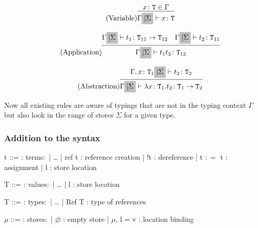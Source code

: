 \begin{equation*}
    \tag{Variable}
    \infer{
        \Gamma \colorbox{lightgray}{$| \Sigma$} \vdash x \colon \texttt{T}
    }{
        x \colon \texttt{T} \in \Gamma
    }
\end{equation*}

\begin{equation*}
    \tag{Application}
    \infer{
        \Gamma \colorbox{lightgray}{$| \Sigma$} \vdash t_1 t_2 \colon \texttt{T}_{12}
    }{
        \Gamma \colorbox{lightgray}{$| \Sigma$} \vdash t_1 \colon \texttt{T}_{11} \rightarrow \texttt{T}_{12}
        &
        \Gamma \colorbox{lightgray}{$| \Sigma$} \vdash t_2 \colon \texttt{T}_{11}
    }
\end{equation*}

\begin{equation*}
    \tag{Abstraction}
    \infer{
        \Gamma \colorbox{lightgray}{$| \Sigma$} \vdash \lambda x \colon \texttt{T}_1 . t_2 \colon \texttt{T}_1 \rightarrow \texttt{T}_2
    }{
        \Gamma,x \colon \texttt{T}_1 \colorbox{lightgray}{$| \Sigma$} \vdash t_2 \colon \texttt{T}_2
    }
\end{equation*}

Now all existing rules are aware of typings that are not in the typing context
$\Gamma$ but also look in the range of stores $\Sigma$ for a given type.

\subsubsection{Addition to the syntax \cite{pierce2002ProgLang}}
\begin{bnfgrammar}
    t ::= : terms$\colon$
    | \dots
    | ref t : reference creation
    | !t : dereference
    | t $\colon=$ t : assignment
    | l : store location
\end{bnfgrammar}\leavevmode\newline

\begin{bnfgrammar}
    T ::= : values$\colon$
    | \dots
    | l : store location
\end{bnfgrammar}\leavevmode\newline

\begin{bnfgrammar}
    T ::= : types$\colon$
    | \dots
    | Ref T : type of references
\end{bnfgrammar}\leavevmode\newline

\begin{bnfgrammar}
    $\mu$ ::= : stores$\colon$
    | $\varnothing$ : empty store
    | $\mu$, l = v : location binding
\end{bnfgrammar}\leavevmode\newline

